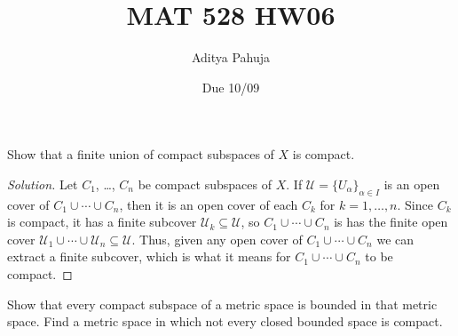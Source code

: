 \documentclass[10pt]{article}
\title{MAT 528 HW06}
\author{\large Aditya Pahuja}
\date{\large Due 10/09}
\newenvironment{soln}{\begin{proof}[Solution]}{\end{proof}}
\begin{document}
\maketitle

\begin{problem}
    [Munkres 26.3]
    Show that a finite union of compact subspaces of $X$ is compact.
\end{problem}

\begin{soln}
    Let $C_1$, \dots, $C_n$ be compact subspaces of $X$.
    If $\mathcal U = \{U_\alpha\}_{\alpha\in I}$ is an open cover
    of $C_1\cup\cdots\cup C_n$, then it is an open cover
    of each $C_k$ for $k = 1,\dots,n$. Since $C_k$ is compact,
    it has a finite subcover $\mathcal U_k\subseteq \mathcal U$,
    so $C_1\cup\cdots\cup C_n$ is has the finite open cover
    $\mathcal U_1\cup\cdots\cup\mathcal U_n\subseteq\mathcal U$.
    Thus, given any open cover of $C_1\cup\cdots\cup C_n$
    we can extract a finite subcover,
    which is what it means for $C_1\cup\cdots\cup C_n$ to be compact.
\end{soln}

\begin{problem}
    [Munkres 26.4]
    Show that every compact subspace of a metric space
    is bounded in that metric space. Find a metric space
    in which not every closed bounded space is compact.
\end{problem}
\end{document}
